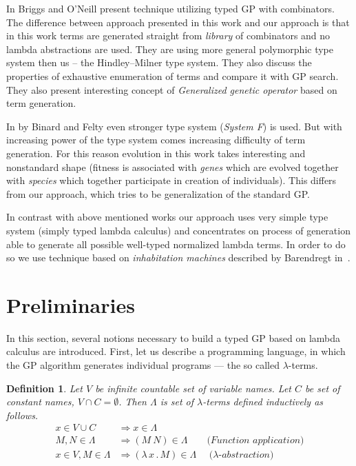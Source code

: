\documentclass[conference]{IEEEtran}
\newtheorem{definition}{Definition}
\newcommand{\lets}{let us\xspace}
\newcommand{\lterms}{$\lambda$-terms\xspace}
\newcommand{\then}{\Rightarrow\xspace}
\newcommand{\lamb}[2]{( \lambda \, #1 \, . \, #2 )}
\begin{document}
In \cite{kes} Briggs and O’Neill present technique 
utilizing typed GP with combinators.
The difference between approach presented in this work
and our approach is that in this work terms are generated
straight from \textit{library} of combinators and no lambda abstractions
are used. They are using more general polymorphic type system then us
-- the Hindley–Milner type system. They also discuss the 
properties of exhaustive enumeration of terms and compare it with GP search.  
They also present interesting concept of \textit{Generalized
genetic operator} based on term generation. 

In \cite{binard2008genetic} by Binard and Felty even 
stronger type system (\textit{System F}) is used.  
But with increasing power of the type system comes increasing difficulty of term generation.
For this reason evolution in this work takes interesting and nonstandard shape 
(fitness is associated with \textit{genes} which are evolved together with \textit{species}
which together participate in creation of individuals).
This differs from our approach, which tries to be generalization of
the standard GP\cite{koza92}.

In contrast with above mentioned works our approach uses very simple type system 
(simply typed lambda calculus) and concentrates on process of generation  
able to generate all possible well-typed normalized lambda terms. In order to do
so we use technique based on \textit{inhabitation machines} 
described by Barendregt in~\cite{barendregt10}.    


\section{Preliminaries}
\label{preliminaries}

In this section, several notions necessary to build a typed GP based on lambda calculus are introduced. 
First, \lets 
describe a programming language, 
in which the GP algorithm generates individual programs --- the so called \lterms.  

\begin{definition}
Let $V$ be infinite countable set of {\it 
variable names}. Let $C$ be set of {\it constant names}, 
$V \cap C = \emptyset$.	 	
Then $\Lambda$ is set of {\it \lterms} defined inductively as follows.	
\begin{align*}
x   \in V \cup C  &\then x     \in \Lambda \\
M,N \in \Lambda   &\then (M~N) \in \Lambda 
\textit{~~~~~~(Function application)} \\
x   \in V , M \in \Lambda &\then \lamb{x}{M} \in \Lambda
\textit{~~~~($\lambda$-abstraction)} 
\end{align*}
\end{definition}
\end{document}

